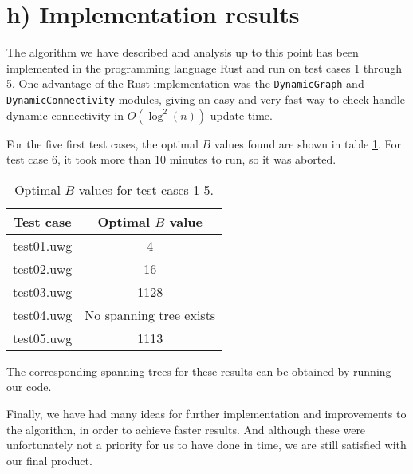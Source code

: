 \section*{h) Implementation results}

The algorithm we have described and analysis up to this point has been implemented in the programming language Rust and run on test cases 1 through 5. One advantage of the Rust implementation was the \texttt{DynamicGraph} and \texttt{DynamicConnectivity} modules, giving an easy and very fast way to check handle dynamic connectivity in $O(\log^2(n))$ update time. 

For the five first test cases, the optimal $B$ values found are shown in table \ref{tab:results}. For test case 6, it took more than 10 minutes to run, so it was aborted. 
\begin{table}[ht!]
    \centering
    \begin{tabular}{c|c}
        Test case & Optimal $B$ value \\\hline
        test01.uwg & 4 \\
        test02.uwg & 16 \\
        test03.uwg & 1128 \\
        test04.uwg & No spanning tree exists \\
        test05.uwg & 1113
    \end{tabular}
    \caption{Optimal $B$ values for test cases 1-5. }
    \label{tab:results}
\end{table}

The corresponding spanning trees for these results can be obtained by running our code. 

Finally, we have had many ideas for further implementation and improvements to the algorithm, in order to achieve faster results. And although these were unfortunately not a priority for us to have done in time, we are still satisfied with our final product. 
